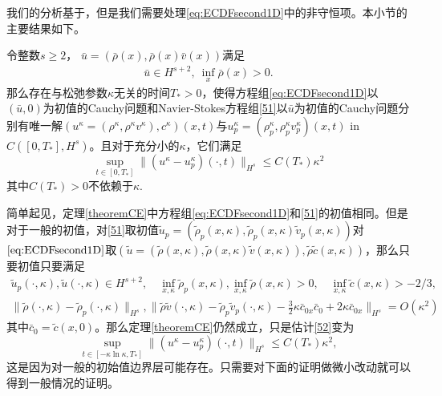 我们的分析基于\cite{yang2015validity}，但是我们需要处理\eqref{eq:ECDFsecond1D}中的非守恒项。本小节的主要结果如下。
\begin{theorem}\label{theoremCE}
令整数$s \ge 2$， ${\bar u} =({\bar \rho}(x),\bar{\rho}(x){\bar v}(x))$满足
  \begin{eqnarray*}
    \bar{u}\in H^{s+2},\ \inf_{x} \bar{\rho}(x)>0.
 \end{eqnarray*}
那么存在与松弛参数$\kappa$无关的时间$T_*>0$，使得方程组\eqref{eq:ECDFsecond1D}以$(\bar{u},0)$为初值的Cauchy问题和Navier-Stokes方程组\eqref{51}以${\bar u}$为初值的Cauchy问题分别有唯一解$(u^\kappa=(\rho^\kappa,\rho^\kappa v^\kappa), c^\kappa)(x,t)$与$u^\kappa_p=(\rho^\kappa_p,\rho^\kappa_p v^\kappa_p)(x,t)$ in $C([0,T_*], H^s)$。且对于充分小的$\kappa$，它们满足
  \begin{equation}\label{52}
    \sup_{t \in [0, T_*]} \|(u^\kappa-u^\kappa_p)(\cdot,t)\|_{H^s} \le C(T_*) \kappa^2
  \end{equation}
 其中$C(T_*)>0$不依赖于$\kappa$.
\end{theorem}

\begin{remark}
简单起见，定理\ref{theoremCE}中方程组\eqref{eq:ECDFsecond1D}和\eqref{51}的初值相同。但是对于一般的初值，对\eqref{51}$取初值{\tilde u}_p =({\tilde \rho}_p(x, \kappa),\tilde{\rho}_p(x,\kappa){\tilde v}_p(x, \kappa))$对$\eqref{eq:ECDFsecond1D}$取$({\tilde u} =({\tilde \rho}(x, \kappa),\tilde{\rho}(x,\kappa){\tilde v}(x, \kappa)),\tilde{\rho} \tilde {c}(x, \kappa))$，那么只要初值只要满足
\begin{eqnarray*}
    \tilde{u}_p(\cdot,\kappa),\tilde{u}(\cdot,\kappa) \in H^{s+2}, \quad  \inf_{x, \kappa} \tilde{\rho}_p(x,\kappa), \inf_{x, \kappa} \tilde{\rho}(x,\kappa)>0, \quad \inf_{x, \kappa} \tilde{c}(x,\kappa)> -2/3, \nonumber  \\
    \|\tilde{\rho}(\cdot,\kappa)-\tilde{\rho}_p(\cdot,\kappa)\|_{H^s}, \| \tilde{\rho} \tilde{v}(\cdot,\kappa)-\tilde{\rho}_p\tilde{v}_p(\cdot,\kappa)- \frac{3}{2} \kappa \bar{c}_{0x} \bar{c}_0 +2 \kappa \bar{c}_{0x}\|_{H^s}  = O(\kappa^2)
 \end{eqnarray*}
  其中$\bar{c}_0=\tilde{c}(x,0)$。那么定理\ref{theoremCE}仍然成立，只是估计\eqref{52}变为
\begin{equation*}\label{eq:Result}
    \sup_{t \in [-\kappa\ln\kappa, T_*]} \|(u^\kappa-
    u^\kappa_p)(\cdot,t)\|_{H^s} \le C(T_*) \kappa^2,
  \end{equation*}
  这是因为对一般的初始值边界层可能存在。只需要对下面的证明做微小改动就可以得到一般情况的证明。
\end{remark}

